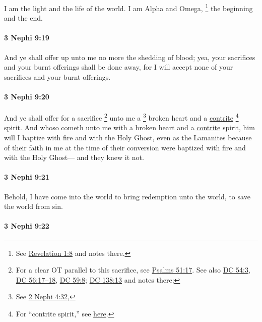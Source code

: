 			I am the light and the life of the world.
			I am Alpha and Omega,%
				\footnote{%
					See \hyperref[REVELATIONNT-1-8]{Revelation 1:8} and notes there.
					}
			the beginning and the end.

		\paragraph{3 Nephi 9:19} %
			\label{3NEPHI-9-19}

			And ye shall offer up unto me no more the shedding of blood;
			yea, your sacrifices and your burnt offerings shall be done away,
			for I will accept none of your sacrifices and your burnt offerings.

		\paragraph{3 Nephi 9:20} %
			\label{3NEPHI-9-20}

			And ye shall offer for a sacrifice%
				\footnote{%
					For a clear OT parallel to this sacrifice, see \hyperref[PSALMS-51-17]{Psalms 51:17}. See also \hyperref[DC54-3]{DC 54:3}, \hyperref[DC56-17]{DC 56:17--18}, \hyperref[DC59-8]{DC 59:8}; \hyperref[DC138-13]{DC 138:13} and notes there;
					}
			unto me a
				\footnote{%
					See \hyperref[2NEPHI-4-32]{2 Nephi 4:32}, 
					}%
			broken heart and a \hyperref[CONTRITE]{contrite}%
				\footnote{%
					For ``contrite spirit,'' see \hyperref[SPIRIT-PHRASES]{here}.
					} 
			spirit.
			And whoso cometh unto me with a broken heart and a \hyperref[CONTRITE]{contrite} spirit,
			him will I baptize with fire and with the Holy Ghost,
			even as the Lamanites
			because of their faith in me at the time of their conversion
			were baptized with fire and with the Holy Ghost---
			and they knew it not.

		\paragraph{3 Nephi 9:21} %
			\label{3NEPHI-9-21}

			Behold, I have come into the world
			to bring redemption unto the world,
			to save the world from sin.

		\paragraph{3 Nephi 9:22} %
			\label{3NEPHI-9-22}

